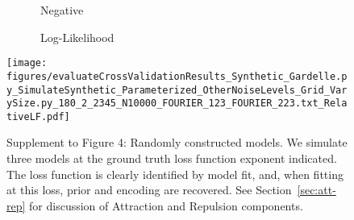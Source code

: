 \begin{figure}
\begin{minipage}[c]{0.8\linewidth}
\end{minipage}
\begin{minipage}[c]{0.19\linewidth}
\centering

\ \ \ \ \ \ Negative

\ \ \ \ \ \ Log-Likelihood


\texttt{[image: figures/evaluateCrossValidationResults\_Synthetic\_Gardelle.py\_SimulateSynthetic\_Parameterized\_OtherNoiseLevels\_Grid\_VarySize.py\_180\_2\_2345\_N10000\_FOURIER\_123\_FOURIER\_223.txt\_RelativeLF.pdf]}
\end{minipage}

\caption{Supplement to Figure 4: Randomly constructed models.
We simulate three models at the ground truth loss function exponent indicated.
The loss function is clearly identified by model fit, and, when fitting at this loss, prior and encoding are recovered.
See Section~\ref{sec:att-rep} for discussion of Attraction and Repulsion components.
}
\label{fig:fourier-2}
\end{figure}


